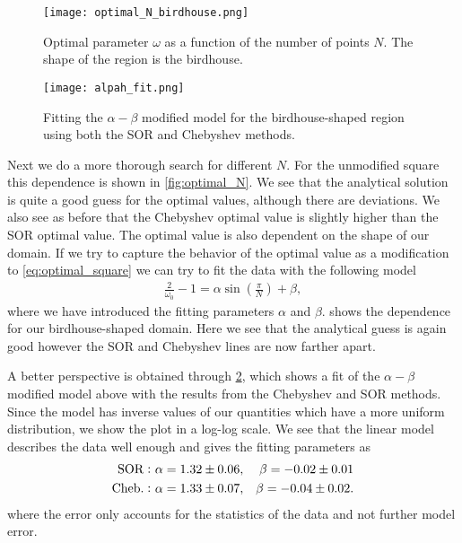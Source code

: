 \documentclass[10pt,a4paper,twocolumn]{article}
\begin{document}
\begin{figure}[!h]
    \centering
    \texttt{[image: optimal\_N\_birdhouse.png]}
    \caption{Optimal parameter $\omega$ as a function of the number of points $N$. The shape of the region is the birdhouse.}
    \label{fig:optimal_N_birdhouse}
\end{figure}

\begin{figure}[!b]
    \centering
    \texttt{[image: alpah\_fit.png]}
    \caption{Fitting the $\alpha-\beta$ modified model for the birdhouse-shaped region using both the SOR and Chebyshev methods.}
    \label{fig:alpha_fit}
\end{figure}

Next we do a more thorough search for different $N$. For the unmodified square this dependence is shown in \cref{fig:optimal_N}. We see that the analytical solution is quite a good guess for the optimal values, although there are deviations. We also see as before that the Chebyshev optimal value is slightly higher than the SOR optimal value. The optimal value is also dependent on the shape of our domain. If we try to capture the behavior of the optimal value as a modification to \cref{eq:optimal_square} we can try to fit the data with the following model
%
\begin{align}
    \frac{2}{\omega_0} - 1 = \alpha \sin \left( \frac{\pi}{N} \right) + \beta,
\end{align}
%
where we have introduced the fitting parameters $\alpha$ and $\beta$.
 shows the dependence for our birdhouse-shaped domain. Here we see that the analytical guess is again good however the SOR and Chebyshev lines are now farther apart.

A better perspective is obtained through \cref{fig:alpha_fit}, which shows a fit of the $\alpha-\beta$ modified model above with the results from the Chebyshev and SOR methods. Since the model has inverse values of our quantities which have a more uniform distribution, we show the plot in a log-log scale. We see that the linear model describes the data well enough and gives the fitting parameters as
%
\begin{align}
    \mathrm{SOR:}\ &\alpha = 1.32 \pm 0.06, &\beta = -0.02 \pm 0.01\notag\\
    \mathrm{Cheb.:}\ &\alpha = 1.33 \pm 0.07, &\beta = -0.04 \pm 0.02.
\end{align}
%
where the error only accounts for the statistics of the data and not further model error.
\end{document}
